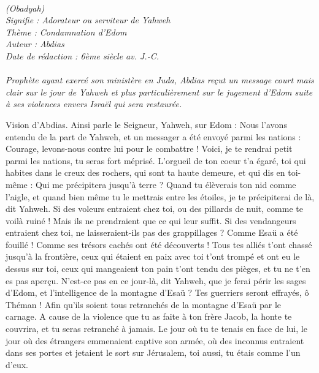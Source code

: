 \BFont
\noindent\hrulefill
{\footnotesize
\textit{
\bigskip
{\centering{}
\\(Obadyah)
\\Signifie : Adorateur ou serviteur de Yahweh
\\Thème : Condamnation d'Edom
\\Auteur : Abdias
\\Date de rédaction : 6ème siècle av. J.-C.\\}
}
\textit{
\\Prophète ayant exercé son ministère en Juda, Abdias reçut un message court mais clair sur le jour de Yahweh et plus particulièrement sur le jugement d’Edom suite à ses violences envers Israël qui sera restaurée.\bigskip
}
}
\par\nobreak\noindent\hrulefill
\begin{multicols}{2}
\VerseOne{}Vision d'Abdias. Ainsi parle le Seigneur, Yahweh, sur Edom : Nous l’avons entendu de la part de Yahweh, et un messager a été envoyé parmi les nations : Courage, levons-nous contre lui pour le combattre !
Voici, je te rendrai petit parmi les nations, tu seras fort méprisé.
L'orgueil de ton coeur t'a égaré, toi qui habites dans le creux des rochers, qui sont ta haute demeure, et qui dis en toi-même : Qui me précipitera jusqu’à terre ?
Quand tu élèverais ton nid comme l'aigle, et quand bien même tu le mettrais entre les étoiles, je te précipiterai de là, dit Yahweh.
Si des voleurs entraient chez toi, ou des pillards de nuit, comme te voilà ruiné ! Mais ils ne prendraient que ce qui leur suffit. Si des vendangeurs entraient chez toi, ne laisseraient-ils pas des grappillages ?
Comme Esaü a été fouillé ! Comme ses trésors cachés ont été découverts !
Tous tes alliés t'ont chassé jusqu'à la frontière, ceux qui étaient en paix avec toi t'ont trompé et ont eu le dessus sur toi, ceux qui mangeaient ton pain t'ont tendu des pièges, et tu ne t’en es pas aperçu.
N’est-ce pas en ce jour-là, dit Yahweh, que je ferai périr les sages d'Edom, et l’intelligence de la montagne d'Esaü ?
Tes guerriers seront effrayés, ô Théman ! Afin qu’ils soient tous retranchés de la montagne d'Esaü par le carnage.
A cause de la violence que tu as faite à ton frère Jacob, la honte te couvrira, et tu seras retranché à jamais.
Le jour où tu te tenais en face de lui, le jour où des étrangers emmenaient captive son armée, où des inconnus entraient dans ses portes et jetaient le sort sur Jérusalem, toi aussi, tu étais comme l'un d'eux.

\end{multicols}
